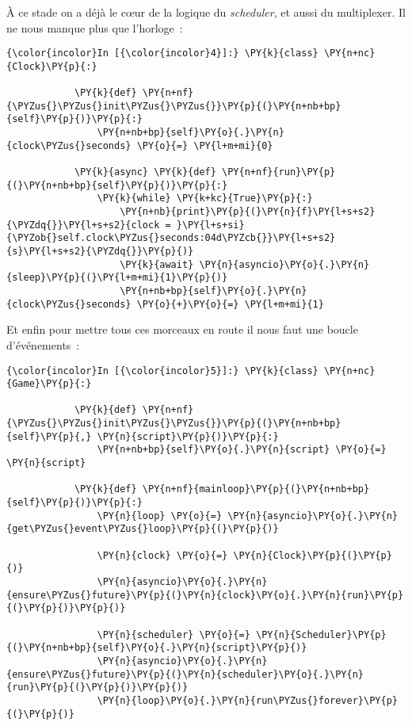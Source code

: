     À ce stade on a déjà le cœur de la logique du \emph{scheduler}, et aussi
du multiplexer. Il ne nous manque plus que l'horloge~:

    \begin{Verbatim}[commandchars=\\\{\},frame=single,framerule=0.3mm,rulecolor=\color{cellframecolor}]
{\color{incolor}In [{\color{incolor}4}]:} \PY{k}{class} \PY{n+nc}{Clock}\PY{p}{:}
        
            \PY{k}{def} \PY{n+nf}{\PYZus{}\PYZus{}init\PYZus{}\PYZus{}}\PY{p}{(}\PY{n+nb+bp}{self}\PY{p}{)}\PY{p}{:}
                \PY{n+nb+bp}{self}\PY{o}{.}\PY{n}{clock\PYZus{}seconds} \PY{o}{=} \PY{l+m+mi}{0}
        
            \PY{k}{async} \PY{k}{def} \PY{n+nf}{run}\PY{p}{(}\PY{n+nb+bp}{self}\PY{p}{)}\PY{p}{:}
                \PY{k}{while} \PY{k+kc}{True}\PY{p}{:}
                    \PY{n+nb}{print}\PY{p}{(}\PY{n}{f}\PY{l+s+s2}{\PYZdq{}}\PY{l+s+s2}{clock = }\PY{l+s+si}{\PYZob{}self.clock\PYZus{}seconds:04d\PYZcb{}}\PY{l+s+s2}{s}\PY{l+s+s2}{\PYZdq{}}\PY{p}{)}
                    \PY{k}{await} \PY{n}{asyncio}\PY{o}{.}\PY{n}{sleep}\PY{p}{(}\PY{l+m+mi}{1}\PY{p}{)}
                    \PY{n+nb+bp}{self}\PY{o}{.}\PY{n}{clock\PYZus{}seconds} \PY{o}{+}\PY{o}{=} \PY{l+m+mi}{1}
\end{Verbatim}


    Et enfin pour mettre tous ces morceaux en route il nous faut une boucle
d'événements~:

    \begin{Verbatim}[commandchars=\\\{\},frame=single,framerule=0.3mm,rulecolor=\color{cellframecolor}]
{\color{incolor}In [{\color{incolor}5}]:} \PY{k}{class} \PY{n+nc}{Game}\PY{p}{:}
        
            \PY{k}{def} \PY{n+nf}{\PYZus{}\PYZus{}init\PYZus{}\PYZus{}}\PY{p}{(}\PY{n+nb+bp}{self}\PY{p}{,} \PY{n}{script}\PY{p}{)}\PY{p}{:}
                \PY{n+nb+bp}{self}\PY{o}{.}\PY{n}{script} \PY{o}{=} \PY{n}{script}
        
            \PY{k}{def} \PY{n+nf}{mainloop}\PY{p}{(}\PY{n+nb+bp}{self}\PY{p}{)}\PY{p}{:}
                \PY{n}{loop} \PY{o}{=} \PY{n}{asyncio}\PY{o}{.}\PY{n}{get\PYZus{}event\PYZus{}loop}\PY{p}{(}\PY{p}{)}
        
                \PY{n}{clock} \PY{o}{=} \PY{n}{Clock}\PY{p}{(}\PY{p}{)}
                \PY{n}{asyncio}\PY{o}{.}\PY{n}{ensure\PYZus{}future}\PY{p}{(}\PY{n}{clock}\PY{o}{.}\PY{n}{run}\PY{p}{(}\PY{p}{)}\PY{p}{)}
        
                \PY{n}{scheduler} \PY{o}{=} \PY{n}{Scheduler}\PY{p}{(}\PY{n+nb+bp}{self}\PY{o}{.}\PY{n}{script}\PY{p}{)}
                \PY{n}{asyncio}\PY{o}{.}\PY{n}{ensure\PYZus{}future}\PY{p}{(}\PY{n}{scheduler}\PY{o}{.}\PY{n}{run}\PY{p}{(}\PY{p}{)}\PY{p}{)}
                \PY{n}{loop}\PY{o}{.}\PY{n}{run\PYZus{}forever}\PY{p}{(}\PY{p}{)}
\end{Verbatim}


